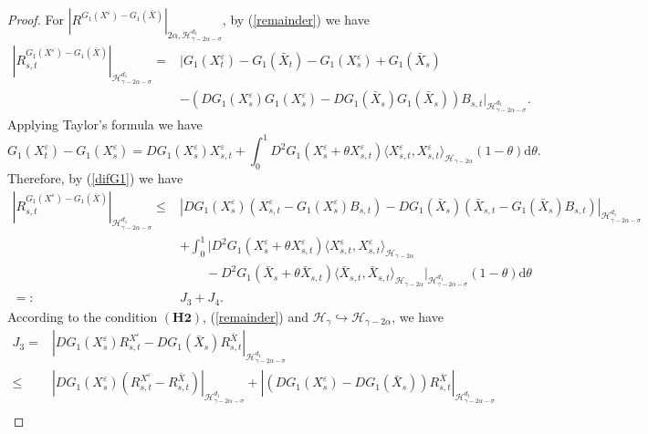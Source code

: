 \documentclass[10pt,a4paper]{amsart}
\begin{document}
\begin{proof}
	For $|R^{G_1(X^\varepsilon)-G_1(\bar{X})} |_{2\alpha, \mathcal H_{\gamma-2\alpha-\sigma}^{d_1 } }$, by (\ref{remainder}) we have	
	\begin{align*}
		\left|R^{G_1(X^\varepsilon)-G_1(\bar{X})}_{s,t} \right|_{\mathcal H_{\gamma-2\alpha-\sigma}^{d_1 }}
		=&\big|G_1(X_t^\varepsilon)-G_1(\bar{X}_t)-G_1(X_s^\varepsilon)+G_1(\bar{X}_s)  \nonumber\\ &-(DG_1(X_s^\varepsilon)G_1(X_s^\varepsilon)-DG_1(\bar{X}_s)G_1(\bar{X}_s)) B_{s,t} \big|_{\mathcal H_{\gamma-2\alpha-\sigma}^{d_1 }}.
	\end{align*}	
	Applying Taylor's formula we have
	\begin{equation}\label{difG1}
		G_1(X_t^\varepsilon)-G_1(X_s^\varepsilon)=DG_1(X_s^\varepsilon)X_{s,t}^\varepsilon+\int_0^1 D^2 G_1(X_s^\varepsilon+\theta X_{s,t}^\varepsilon) \langle X_{s,t}^\varepsilon, X_{s,t}^\varepsilon \rangle_{\mathcal H_{\gamma-2\alpha} }  (1-\theta) \mathrm{d} \theta.	
	\end{equation}
	Therefore, by (\ref{difG1}) we have
	\begin{align*}
		\left|R^{G_1(X^\varepsilon)-G_1(\bar{X})}_{s,t} \right|_{\mathcal H_{\gamma-2\alpha-\sigma}^{d_1 }}
		\leq & |DG_1(X_s^\varepsilon)(X_{s,t}^\varepsilon -G_1(X_s^\varepsilon) B_{s,t})-DG_1(\bar{X}_s)(\bar{X}_{s,t}-G_1(\bar{X}_s) B_{s,t}) |_{\mathcal H_{\gamma-2\alpha-\sigma}^{d_1 }}  \nonumber\\
		&+\int_0^1 |D^2 G_1(X_s^\varepsilon+\theta X_{s,t}^\varepsilon)  \langle X_{s,t}^\varepsilon, X_{s,t}^\varepsilon \rangle_{\mathcal H_{\gamma-2\alpha} }   \nonumber\\
		&~~~~~~~~~-D^2 G_1(\bar{X}_s+\theta \bar{X}_{s,t})  \langle \bar{X}_{s,t}, \bar{X}_{s,t} \rangle_{\mathcal H_{\gamma-2\alpha} }  |_{\mathcal H_{\gamma-2\alpha-\sigma}^{d_1 }} (1-\theta) \mathrm{d} \theta  \nonumber\\
		=: & J_3+J_4.
	\end{align*}
	According to the condition $(\mathbf{H2})$, (\ref{remainder}) and $\mathcal H_\gamma \hookrightarrow \mathcal H_{\gamma-2\alpha}$, we have
	\begin{align}\label{J3}
		J_3=&|DG_1(X_s^\varepsilon) R_{s,t}^{X^\varepsilon}-DG_1(\bar{X}_s) R_{s,t}^{\bar{X}} |_{\mathcal H_{\gamma-2\alpha-\sigma}^{d_1 }}  \nonumber\\
		\leq & |DG_1(X_s^\varepsilon) (R_{s,t}^{X^\varepsilon}-R_{s,t}^{\bar{X}}) |_{\mathcal H_{\gamma-2\alpha-\sigma}^{d_1 }}
		+| (DG_1(X_s^\varepsilon)-DG_1(\bar{X}_s)) R_{s,t}^{\bar{X}} |_{\mathcal H_{\gamma-2\alpha-\sigma}^{d_1 }} \nonumber\\

\end{align}
\end{proof}
\end{document}
